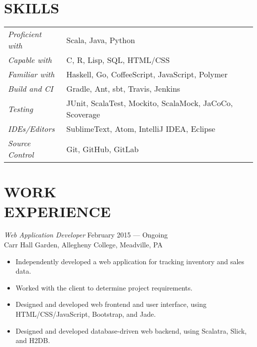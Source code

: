 \documentclass[margin]{res}
\begin{document}
\begin{resume}
\section{SKILLS}
   \begin{tabular}{l p{3in}}
                \textit{Proficient with} & Scala, Java, Python \\
                \textit{Capable with} & C, R, Lisp, SQL, HTML/CSS \\
                \textit{Familiar with} & Haskell, Go, CoffeeScript, JavaScript, Polymer \\
   	            \textit{Build and CI}  & Gradle, Ant, sbt, Travis, Jenkins \\
                \textit{Testing}  & JUnit, ScalaTest, Mockito, ScalaMock, JaCoCo, Scoverage \\
                \textit{IDEs/Editors}  & SublimeText, Atom, IntelliJ IDEA, Eclipse \\
                \textit{Source Control} &Git, GitHub, GitLab
 \end{tabular}


\section{WORK \\ EXPERIENCE} 

        {\sl Web Application Developer} \hfill  February 2015 --- Ongoing \\
                Carr Hall Garden, Allegheny College, Meadville, PA
                 \begin{itemize}  \itemsep -2pt %
                    \item Independently developed a web application for tracking inventory and sales data.
                    \item Worked with the client to determine project requirements.
                    \item Designed and developed web frontend and user interface, using HTML/CSS/JavaScript, Bootstrap, and Jade.
                    \item Designed and developed database-driven web backend, using Scalatra, Slick, and H2DB. 
                 \end{itemize}


\end{resume}
\end{document}
